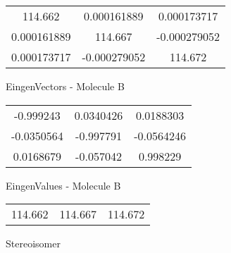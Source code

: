 \begin{multicols}{2}
\begin{center}
\begin{tabular}{|c c c|}
114.662	 & 	0.000161889	 & 	0.000173717	 \\
0.000161889	 & 	114.667	 & 	-0.000279052	 \\
0.000173717	 & 	-0.000279052	 & 	114.672
\end{tabular}

\vtab
 EingenVectors - Molecule B     \\
\vtab
\begin{tabular}{|c c c|}
-0.999243	 & 	0.0340426	 & 	0.0188303	 \\
-0.0350564	 & 	-0.997791	 & 	-0.0564246	 \\
0.0168679	 & 	-0.057042	 & 	0.998229
\end{tabular}

\vtab
 EingenValues - Molecule B     \\
\vtab
\begin{tabular}{|c c c|}
114.662	 & 	114.667	 & 	114.672	 \\
\end{tabular}

\end{center}
\end{multicols}
\begin{center}
\vtab
\vtab
\textcolor{NavyBlue}{\Large Stereoisomer}
\end{center}

 \newpage

